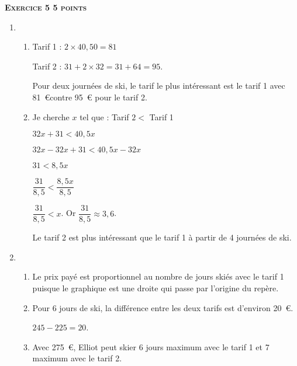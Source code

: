 \textbf{\textsc{Exercice 5 \hfill 5 points}}

\medskip

\begin{enumerate}
\item 
	\begin{enumerate}
		\item Tarif 1 : $2 \times 40,50 = 81$
		
Tarif 2 : $31 + 2 \times 32 = 31 + 64 = 95$.
		
Pour deux journées de ski, le tarif le plus intéressant est le tarif 1 avec 81~\euro contre 95~\euro
pour le tarif 2.
		\item Je cherche $x$ tel que : Tarif $2 <$ Tarif 1

$32x + 31 < 40,5x$

$32x - 32x + 31 < 40,5x - 32x$

$31 < 8,5x$

$\dfrac{31}{8,5} < \dfrac{8,5x}{8,5}$

$\dfrac{31}{8,5} < x$. Or $\dfrac{31}{8,5} \approx 3,6$.

Le tarif 2 est plus intéressant que le tarif 1 à partir de 4 journées de ski.
	\end{enumerate}
\item 
	\begin{enumerate}
		\item Le prix payé est proportionnel au nombre de jours skiés avec le tarif 1 puisque le
graphique est une droite qui passe par l'origine du repère.
		\item Pour 6 jours de ski, la différence entre les deux tarifs est d'environ 20~\euro.
		
$245 - 225 = 20$.
		\item Avec 275~\euro, Elliot peut skier 6 jours maximum avec le tarif 1 et 7 maximum avec le
tarif 2.
	\end{enumerate}
\end{enumerate}


\vspace{0,5cm}

